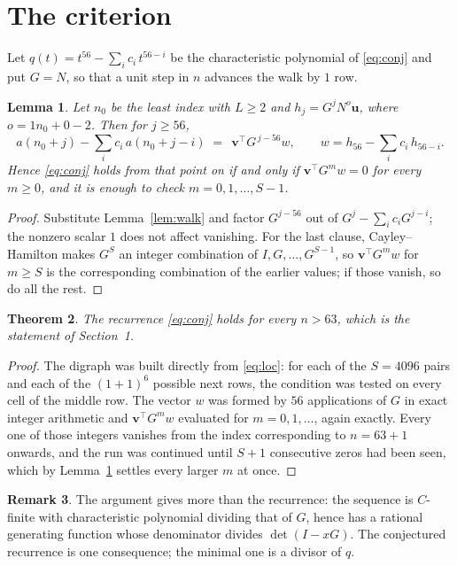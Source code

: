 \documentclass[11pt,a4paper]{article}
\theoremstyle{plain}
\newtheorem{theorem}{Theorem}
\newtheorem{lemma}[theorem]{Lemma}
\theoremstyle{definition}
\newtheorem{remark}[theorem]{Remark}
\begin{document}
\section{The criterion}

Let $q(t)=t^{56}-\sum_i c_i\,t^{56-i}$ be the characteristic polynomial of
\eqref{eq:conj} and put $G=N$, so that a unit step in $n$ advances the walk by
$1$ row.

\begin{lemma}\label{lem:crit}
Let $n_0$ be the least index with $L\ge2$ and $h_j=G^{j}N^{o}\mathbf{u}$, where
$o=1n_0+0-2$. Then for $j\ge56$,
\[
a(n_0+j)-\sum_i c_i\,a(n_0+j-i)\;=\;\,\mathbf{v}^{\!\top}G^{\,j-56}w,
\qquad w=h_{56}-\sum_i c_i\,h_{56-i} .
\]
Hence \eqref{eq:conj} holds from that point on if and only if
$\mathbf{v}^{\!\top}G^{m}w=0$ for every $m\ge0$, and it is enough to check
$m=0,1,\dots,S-1$.
\end{lemma}

\begin{proof}
Substitute Lemma~\ref{lem:walk} and factor $G^{j-56}$ out of
$G^{j}-\sum_ic_iG^{j-i}$; the nonzero scalar $1$ does not affect
vanishing. For the last clause, Cayley--Hamilton makes $G^{S}$ an integer combination of
$I,G,\dots,G^{S-1}$, so $\mathbf{v}^{\!\top}G^{m}w$ for $m\ge S$ is the corresponding
combination of the earlier values; if those vanish, so do all the rest.
\end{proof}

\begin{theorem}
The recurrence \eqref{eq:conj} holds for every $n>63$, which is the statement of
Section~1.
\end{theorem}

\begin{proof}
The digraph was built directly from \eqref{eq:loc}: for each of the $S=4096$ pairs and each
of the $(1+1)^{6}$ possible next rows, the condition was tested on every cell of
the middle row. The vector $w$ was formed by $56$ applications of $G$ in exact integer
arithmetic and $\mathbf{v}^{\!\top}G^{m}w$ evaluated for $m=0,1,\dots$, again exactly.
Every one of those integers vanishes from the index corresponding to $n=63+1$ onwards,
and the run was continued until $S+1$ consecutive zeros had been seen, which by
Lemma~\ref{lem:crit} settles every larger $m$ at once.
\end{proof}

\begin{remark}
The argument gives more than the recurrence: the sequence is $C$-finite with characteristic
polynomial dividing that of $G$, hence has a rational generating function whose denominator
divides $\det(I-xG)$. The conjectured recurrence is one consequence; the minimal one is a
divisor of $q$.
\end{remark}
\end{document}
